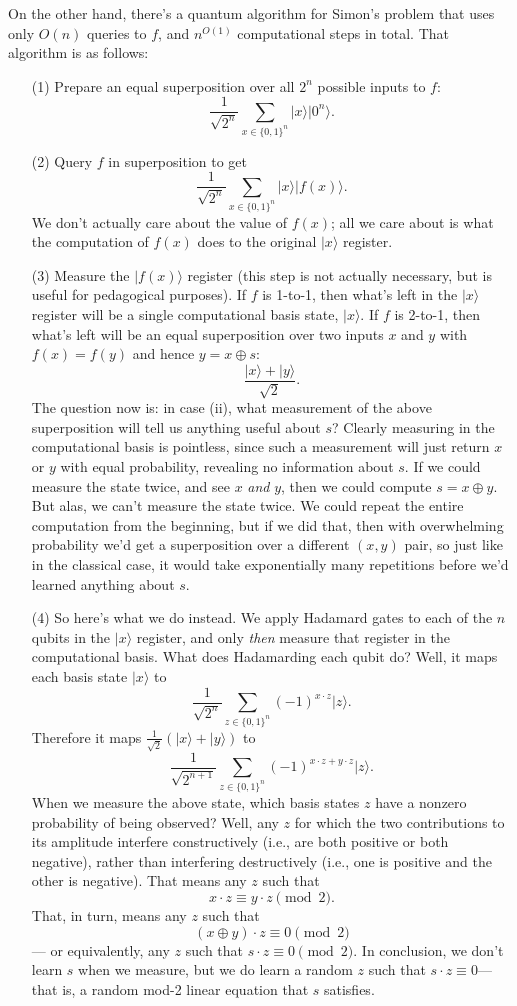 \documentclass[11pt]{report}
\theoremstyle{plain}
\theoremstyle{definition}
\renewcommand{\ket}[1]{|#1\rangle}
\begin{document}
On the other hand, there's a quantum algorithm for Simon's problem that uses only $O(n)$ queries to $f$, and $n^{O(1)}$ computational steps in total.
That algorithm is as follows:

\begin{enumerate}
\item[(1)] Prepare an equal superposition over all $2^n$ possible inputs to $f$:
$$\frac{1}{\sqrt{2^n}}\sum_{x \in \{0,1\}^n} \ket{x} \ket{0^n}.$$
\item[(2)] Query $f$ in superposition to get
$$\frac{1}{\sqrt{2^n}}\sum_{x \in \{0,1\}^n} \ket{x} \ket{f(x)}.$$
We don't actually care about the value of $f(x)$; all we care about is what the computation of $f(x)$ does to the original $\ket{x}$ register.
\item[(3)] Measure the $\ket{f(x)}$ register (this step is not actually necessary, but is useful for pedagogical purposes).
If $f$ is 1-to-1, then what's left in the $\ket{x}$ register will be a single computational basis state, $\ket{x}$. If $f$ is 2-to-1,
then what's left will be an equal superposition over two inputs $x$ and $y$ with $f(x)=f(y)$ and hence $y=x\oplus s$:
$$\frac{\ket{x}+\ket{y}}{\sqrt{2}}.$$
The question now is: in case (ii), what measurement of the above superposition will tell us anything useful about $s$? Clearly measuring
in the computational basis is pointless, since such a measurement will just return $x$ or $y$ with equal probability, revealing no information about $s$.
If we could measure the state twice, and see $x$ {\em and} $y$, then we could compute $s=x\oplus y$. But alas, we can't measure the state twice. We could repeat the entire computation from the beginning, but if we did that, then with overwhelming probability we'd get a superposition over a different $(x,y)$ pair, so
just like in the classical case, it would take exponentially many repetitions before we'd learned anything about $s$.
\item[(4)] So here's what we do instead. We apply Hadamard gates to each of the $n$ qubits in the $\ket{x}$ register, and only {\em then} measure that register in the computational basis. What does Hadamarding each qubit do? Well, it maps each basis state $\ket{x}$ to
    $$ \frac{1}{\sqrt{2^n}} \sum_{z\in \{0,1\}^n} (-1)^{x\cdot z}\ket{z}. $$
    Therefore it maps $\frac{1}{\sqrt{2}}(\ket{x}+\ket{y})$ to
    $$ \frac{1}{\sqrt{2^{n+1}}} \sum_{z\in \{0,1\}^n} (-1)^{x\cdot z + y\cdot z}\ket{z}. $$
    When we measure the above state, which basis states $z$ have a nonzero probability of being observed? Well, any $z$ for which the two contributions to its amplitude interfere constructively (i.e., are both positive or both negative), rather than interfering destructively (i.e., one is positive and the other is negative).  That means any $z$ such that $$x\cdot z \equiv y\cdot z \pmod 2.$$  That, in turn, means any $z$ such that $$(x\oplus y)\cdot z \equiv 0 \pmod 2$$ --- or equivalently, any $z$ such that $s\cdot z \equiv 0 \pmod 2$.  In conclusion, we don't learn $s$ when we measure, but we do learn a random $z$ such that $s\cdot z \equiv 0$---that is, a random mod-2 linear equation that $s$ satisfies.

\end{enumerate}
\end{document}
